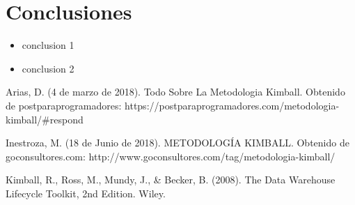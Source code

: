 \documentclass[twoside,twocolumn]{article}
\begin{document}

\section{Conclusiones}
\begin{itemize}	
 \item conclusion 1
\\
\item conclusion 2

\end{itemize} 





\begin{thebibliography}{99} 

\bibitem[1]{}
\newblock Arias, D. (4 de marzo de 2018). Todo Sobre La Metodologia Kimball. Obtenido de postparaprogramadores: https://postparaprogramadores.com/metodologia-kimball/\#respond

\bibitem[2]{}
\newblock Inestroza, M. (18 de Junio de 2018). METODOLOGÍA KIMBALL. Obtenido de goconsultores.com: http://www.goconsultores.com/tag/metodologia-kimball/

\bibitem[3]{}
\newblock Kimball, R., Ross, M., Mundy, J., \& Becker, B. (2008). The Data Warehouse Lifecycle Toolkit, 2nd Edition. Wiley.


\end{thebibliography}


\end{document}
